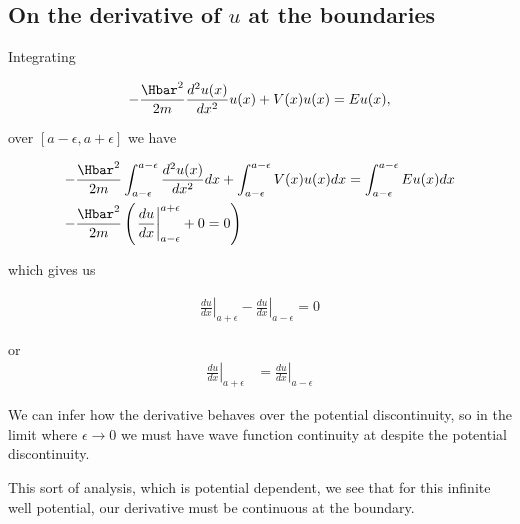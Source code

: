 \subsection{On the derivative of \texorpdfstring{$u$}{u} at the boundaries}

Integrating

\begin{equation}\label{eqn:PHY356Lecture9:20}
\begin{aligned}
-\frac{\Hbar^2 }{2m} \frac{d^2 u(x)}{dx^2} u(x) + V(x) u(x) = E u(x),
\end{aligned}
\end{equation}

over $[a-\epsilon,a+\epsilon]$ we have

\begin{equation}\label{eqn:PHY356Lecture9:21}
\begin{aligned}
-\frac{\Hbar^2 }{2m} &
\int_{a-\epsilon}^{a-\epsilon}
\frac{d^2 u(x)}{dx^2} dx
+
\int_{a-\epsilon}^{a-\epsilon}
V(x) u(x) dx =
\int_{a-\epsilon}^{a-\epsilon}
E u(x) dx \\
-\frac{\Hbar^2 }{2m} &
\left(
\left.\frac{du}{dx}\right\vert_{a-\epsilon}^{a+\epsilon} + 0 = 0
\right)
\end{aligned}
\end{equation}

which gives us

\begin{equation}\label{eqn:PHY356Lecture9:22}
\begin{aligned}
\left.\frac{du}{dx}\right\vert_{a + \epsilon}
-\left.\frac{du}{dx}\right\vert_{a - \epsilon} = 0
\end{aligned}
\end{equation}

or
\begin{equation}\label{eqn:PHY356Lecture9:23}
\begin{aligned}
\left.\frac{du}{dx}\right\vert_{a + \epsilon}
&=
\left.\frac{du}{dx}\right\vert_{a - \epsilon}
\end{aligned}
\end{equation}

We can infer how the derivative behaves over the potential discontinuity, so in the limit where $\epsilon \rightarrow 0$ we must have wave function continuity at despite the potential discontinuity.

This sort of analysis, which is potential dependent, we see that for this infinite well potential, our derivative must be continuous at the boundary.

